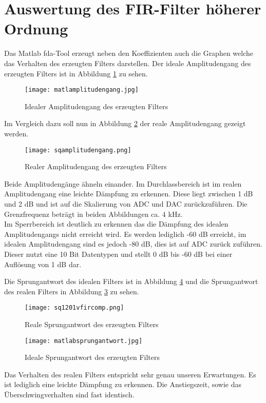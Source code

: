 \section{Auswertung des FIR-Filter h\"oherer Ordnung}
Das Matlab \gls{fda}-Tool erzeugt neben den Koeffizienten auch die Graphen 
welche das Verhalten des erzeugten Filters darstellen. Der ideale Amplitudengang des 
erzeugten Filters ist in Abbildung \ref{fig:MatlabAmpgang} zu sehen. 
\begin{figure}[H]
  \centering
    \texttt{[image: matlamplitudengang.jpg]}
  \caption{Idealer Amplitudengang des erzeugten Filters}
  \label{fig:MatlabAmpgang}
\end{figure}
Im Vergleich dazu soll nun in Abbildung \ref{fig:DSPAmpgang} der reale Amplitudengang gezeigt werden.
\begin{figure}[H]
  \centering
    \texttt{[image: sqamplitudengang.png]}
  \caption{Realer Amplitudengang des erzeugten Filters}
  \label{fig:DSPAmpgang}
\end{figure}
Beide Amplitudeng\"ange \"ahneln einander. Im Durchlassbereich ist im realen Amplitudengang eine leichte D\"ampfung zu erkennen. 
Diese liegt zwischen 1 dB und 2 dB und ist auf die Skalierung von ADC und DAC zur\"uckzuf\"uhren.
Die Grenzfrequenz betr\"agt in beiden Abbildungen ca. 4 kHz.\\
Im Sperrbereich ist deutlich zu erkennen das die D\"ampfung des idealen Amplitudengangs nicht erreicht wird. Es werden lediglich -60 dB erreicht, im idealen Amplitudengang sind es jedoch -80 
dB, dies ist auf ADC zurück zuführen. Dieser nutzt eine 10 Bit Datentypen und stellt 
0 dB bis -60 dB bei einer Auflösung von 1 dB dar.
\\\par

Die Sprungantwort des idealen Filters ist in Abbildung \ref{fig:MatlabSprung} und die Sprungantwort des realen Filters in Abbildung \ref{fig:DSPSprung} zu sehen.
\begin{figure}[H]
  \centering
    \texttt{[image: sq1201vfircomp.png]}
  \caption{Reale Sprungantwort des erzeugten Filters}
  \label{fig:DSPSprung}
\end{figure}
\begin{figure}[H]
  \centering
    \texttt{[image: matlabsprungantwort.jpg]}
  \caption{Ideale Sprungantwort des erzeugten Filters}
  \label{fig:MatlabSprung}
\end{figure}
Das Verhalten des realen Filters entspricht sehr genau unseren Erwartungen. Es ist lediglich eine leichte D\"ampfung zu erkennen.
Die Anstiegszeit, sowie das Überschwingverhalten sind fast identisch.